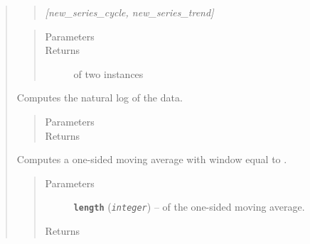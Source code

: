 \documentclass[letterpaper,10pt,openany,oneside]{sphinxmanual}
\begin{document}
\begin{fulllineitems}
\begin{quote}
\begin{fulllineitems}
\begin{quote}
\emph{{[}new\_series\_cycle, new\_series\_trend{]}}
\end{quote}
\begin{quote}\begin{description}
\item[{Parameters}] \leavevmode
\item[{Returns}] \leavevmode
\href{https://docs.python.org/library/functions.html\#list}{} of two {\hyperref[series_class:fredpy.series]{}} instances

\end{description}\end{quote}

\end{fulllineitems}


\begin{fulllineitems}
\label{series_class:fredpy.series.log}
Computes the natural log of the data.
\begin{quote}\begin{description}
\item[{Parameters}] \leavevmode
\item[{Returns}] \leavevmode
{\hyperref[series_class:fredpy.series]{}}

\end{description}\end{quote}

\end{fulllineitems}


\begin{fulllineitems}
\label{series_class:fredpy.series.ma1side}
Computes a one-sided moving average with window equal to .
\begin{quote}\begin{description}
\item[{Parameters}] \leavevmode
\textbf{\texttt{length}} (\emph{\texttt{integer}}) --  of the one-sided moving average.

\item[{Returns}] \leavevmode
{\hyperref[series_class:fredpy.series]{}}

\end{description}\end{quote}


\end{fulllineitems}
\end{quote}
\end{fulllineitems}
\end{document}

